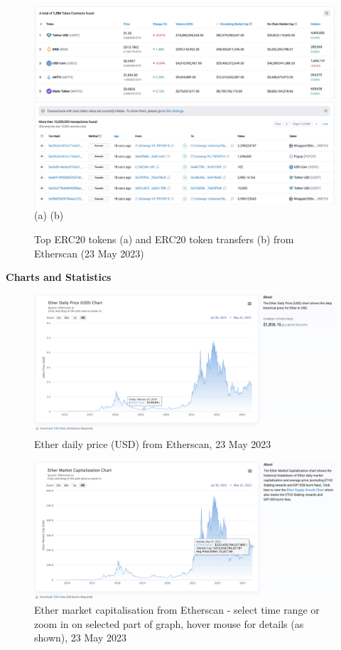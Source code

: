 \documentclass[UTF8]{article}
\begin{document}
\begin{figure}[htbp]
\begin{center}
\includegraphics[width=0.48\linewidth]{images/erc20}
\includegraphics[width=0.48\linewidth]{images/xfrs} \\
(a)\hspace{160pt}        (b)\\
\caption{Top ERC20 tokens (a) and ERC20 token transfers (b) from Etherscan (23 May 2023)}
\label{fig:erc20}
\end{center}
\end{figure}

\clearpage
\textbf{Charts and Statistics}\\

\begin{figure}[htbp]
\begin{center}
\includegraphics[width=0.9\linewidth]{images/ethdaily}
\caption{Ether daily price (USD) from Etherscan, 23 May 2023}
\label{fig:ethdaily}
\end{center}
\end{figure}

\begin{figure}[htbp]
\begin{center}
\includegraphics[width=0.9\linewidth]{images/marketcap}
\caption{Ether market capitalisation from Etherscan  - select time range or zoom in on selected part of graph, hover mouse for details (as shown), 23 May 2023}
\label{fig:marketcap}
\end{center}
\end{figure}
\end{document}
